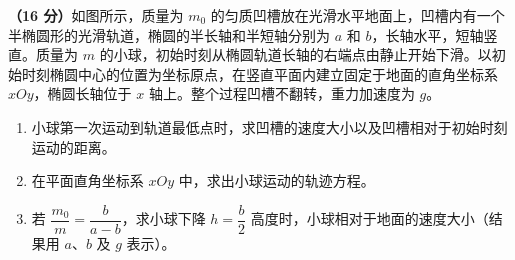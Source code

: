 \begin{question}
\textbf{（16 分）}如图所示，质量为 $m_{0}$ 的匀质凹槽放在光滑水平地面上，凹槽内有一个半椭圆形的光滑轨道，椭圆的半长轴和半短轴分别为 $a$ 和 $b$，长轴水平，短轴竖直。质量为 $m$ 的小球，初始时刻从椭圆轨道长轴的右端点由静止开始下滑。以初始时刻椭圆中心的位置为坐标原点，在竖直平面内建立固定于地面的直角坐标系 $xOy$，椭圆长轴位于 $x$ 轴上。整个过程凹槽不翻转，重力加速度为 $g$。


\begin{enumerate}[leftmargin=2em, label=(\arabic*)]
  \item 小球第一次运动到轨道最低点时，求凹槽的速度大小以及凹槽相对于初始时刻运动的距离。
  \item 在平面直角坐标系 $xOy$ 中，求出小球运动的轨迹方程。
  \item 若 $\dfrac{m_{0}}{m}=\dfrac{b}{a-b}$，求小球下降 $h=\dfrac{b}{2}$ 高度时，小球相对于地面的速度大小（结果用 $a$、$b$ 及 $g$ 表示）。
\end{enumerate}
\end{question}
